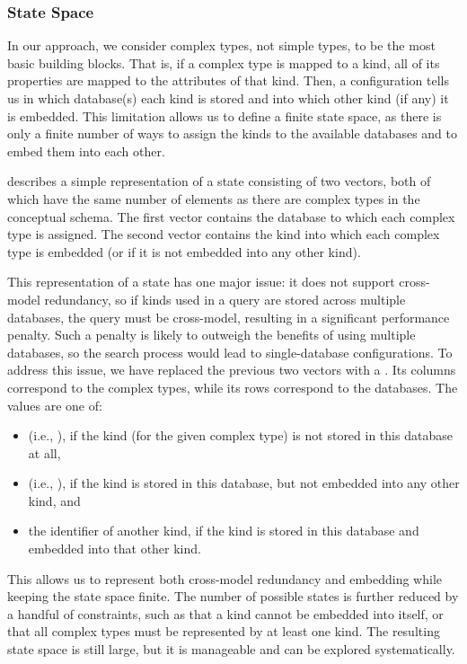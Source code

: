 \subsubsection{State Space}

In our approach, we consider complex types, not simple types, to be the most basic building blocks. That is, if a complex type is mapped to a kind, all of its properties are mapped to the attributes of that kind. Then, a configuration tells us in which database(s) each kind is stored and into which other kind (if any) it is embedded. This limitation allows us to define a finite state space, as there is only a finite number of ways to assign the kinds to the available databases and to embed them into each other.

 describes a simple representation of a state consisting of two vectors, both of which have the same number of elements as there are complex types in the conceptual schema. The first vector contains the database to which each complex type is assigned. The second vector contains the kind into which each complex type is embedded (or  if it is not embedded into any other kind).

This representation of a state has one major issue: it does not support cross-model redundancy, so if kinds used in a query are stored across multiple databases, the query must be cross-model, resulting in a significant performance penalty. Such a penalty is likely to outweigh the benefits of using multiple databases, so the search process would lead to single-database configurations. To address this issue, we have replaced the previous two vectors with a . Its columns correspond to the complex types, while its rows correspond to the databases. The values are one of:
\begin{itemize}
    \item {} (i.e., ), if the kind (for the given complex type) is not stored in this database at all,
    \item {} (i.e., ), if the kind is stored in this database, but not embedded into any other kind, and
    \item the identifier of another kind, if the kind is stored in this database and embedded into that other kind.
\end{itemize}
This allows us to represent both cross-model redundancy and embedding while keeping the state space finite. The number of possible states is further reduced by a handful of constraints, such as that a kind cannot be embedded into itself, or that all complex types must be represented by at least one kind. The resulting state space is still large, but it is manageable and can be explored systematically.

